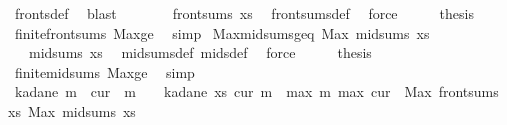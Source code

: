 \begin{isabellebody}
\ fronts{\isacharunderscore}{\kern0pt}def\ \isamarkupfalse%
\ blast\isanewline
\ \ \isamarkupfalse%
\ \isamarkupfalse%
\ {\isachardoublequoteopen}{}\ {\isasymin}\ front{\isacharunderscore}{\kern0pt}sums\ xs{\isachardoublequoteclose}\ \isamarkupfalse%
\ front{\isacharunderscore}{\kern0pt}sums{\isacharunderscore}{\kern0pt}def\ \isamarkupfalse%
\ force\isanewline
\ \ \isamarkupfalse%
\ \isamarkupfalse%
\ {\isacharquery}{\kern0pt}thesis\ \isamarkupfalse%
\ finite{\isacharunderscore}{\kern0pt}front{\isacharunderscore}{\kern0pt}sums\ Max{\isacharunderscore}{\kern0pt}ge\ \isamarkupfalse%
\ simp\isanewline
{}\isamarkupfalse%
%
\endisatagproof
{\isafoldproof}%
%
\isadelimproof
\isanewline
%
\endisadelimproof
\isanewline
{}\isamarkupfalse%
\ Max{\isacharunderscore}{\kern0pt}mid{\isacharunderscore}{\kern0pt}sums{\isacharunderscore}{\kern0pt}geq{\isacharunderscore}{\kern0pt}{}{\isacharcolon}{\kern0pt}\ {\isachardoublequoteopen}Max\ {\isacharparenleft}{\kern0pt}mid{\isacharunderscore}{\kern0pt}sums\ xs{\isacharparenright}{\kern0pt}\ {\isasymge}\ {}{\isachardoublequoteclose}\isanewline
%
\isadelimproof
%
\endisadelimproof
%
\isatagproof
{}\isamarkupfalse%
{\isacharminus}{\kern0pt}\isanewline
\ \ \isamarkupfalse%
\ {\isachardoublequoteopen}{}\ {\isasymin}\ mid{\isacharunderscore}{\kern0pt}sums\ xs{\isachardoublequoteclose}\ \isamarkupfalse%
\ mid{\isacharunderscore}{\kern0pt}sums{\isacharunderscore}{\kern0pt}def\ mids{\isacharunderscore}{\kern0pt}def\ \isamarkupfalse%
\ force\isanewline
\ \ \isamarkupfalse%
\ \isamarkupfalse%
\ {\isacharquery}{\kern0pt}thesis\ \isamarkupfalse%
\ finite{\isacharunderscore}{\kern0pt}mid{\isacharunderscore}{\kern0pt}sums\ Max{\isacharunderscore}{\kern0pt}ge\ \isamarkupfalse%
\ simp\isanewline
{}\isamarkupfalse%
%
\endisatagproof
{\isafoldproof}%
%
\isadelimproof
\isanewline
%
\endisadelimproof
\isanewline
{}\isamarkupfalse%
\ kadane{\isacharcolon}{\kern0pt}\ {\isachardoublequoteopen}m\ {\isasymge}\ cur\ {\isasymLongrightarrow}\ m\ {\isasymge}\ {}\ {\isasymLongrightarrow}\ kadane\ xs\ cur\ m\ {\isacharequal}{\kern0pt}\ max\ m\ {\isacharparenleft}{\kern0pt}max\ {\isacharparenleft}{\kern0pt}cur\ {\isacharplus}{\kern0pt}\ Max\ {\isacharparenleft}{\kern0pt}front{\isacharunderscore}{\kern0pt}sums\ xs{\isacharparenright}{\kern0pt}{\isacharparenright}{\kern0pt}\ {\isacharparenleft}{\kern0pt}Max\ {\isacharparenleft}{\kern0pt}mid{\isacharunderscore}{\kern0pt}sums\ xs{\isacharparenright}{\kern0pt}{\isacharparenright}{\kern0pt}{\isacharparenright}{\kern0pt}{\isachardoublequoteclose}\isanewline

\end{isabellebody}
